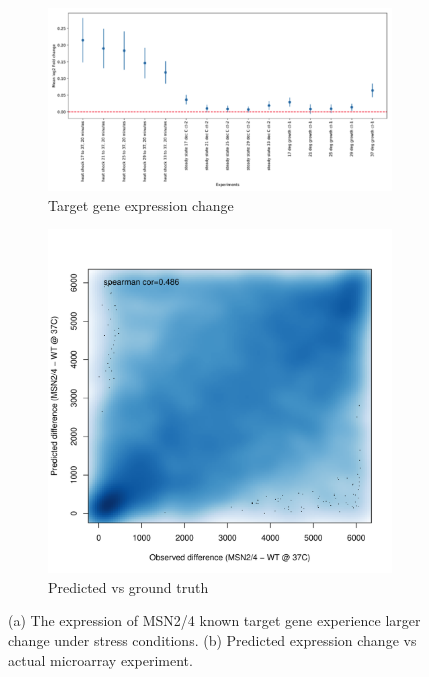 \documentclass{article}
\begin{document}
\begin{figure}
\centering
\begin{subfigure}{.5\textwidth}
  \centering
  \includegraphics[width=1.0\textwidth]{fig/msn24_ko_target_genes.png}
  \caption{Target gene expression change}
  \label{fig:target gene expression change}
\end{subfigure}%
\begin{subfigure}{.5\textwidth}
  \centering
  \includegraphics[width=1.0\textwidth]{fig/msn24_ko_37C_diff_expr_rank.pdf}
  \caption{Predicted vs ground truth}
  \label{fig:predicted vs ground truth msn24 ko}
\end{subfigure}
\caption{(a) The expression of MSN2/4 known target gene experience larger change under stress conditions. (b) Predicted expression change vs actual microarray experiment.}
\label{fig:fig2}
\end{figure}
\end{document}
